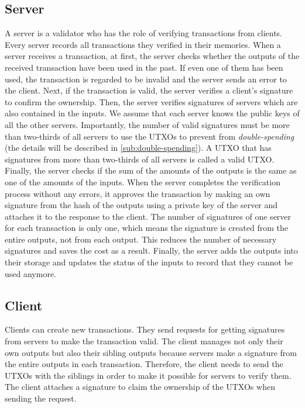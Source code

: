 \documentclass[a4paper, oneside]{discothesis}
\begin{document}
\subsection{Server}
A server is a validator who has the role of verifying transactions from clients.
Every server records all transactions they verified in their memories.
When a server receives a transaction, at first, the server checks
whether the outputs of the received transaction have been used in the past.
If even one of them has been used, the transaction is regarded to be invalid
and the server sends an error to the client.
Next, if the transaction is valid, the server verifies a client's signature
to confirm the ownership.
Then, the server verifies signatures of servers which are also contained in the inputs.
We assume that each server knows the public keys of all the other servers.
Importantly, the number of valid signatures must be more than two-thirds of all servers
to use the UTXOs to prevent from \emph{double-spending}
(the details will be described in \ref{sub:double-spending}).
A UTXO that has signatures from more than two-thirds of all servers is called a valid UTXO.
Finally, the server checks if the sum of the amounts of the outputs is the same
as one of the amounts of the inputs.
When the server completes the verification process without any errors,
it approves the transaction by making an own signature from the hash of the outputs
using a private key of the server and attaches it to the response to the client.
The number of signatures of one server for each transaction is only one,
which means the signature is created from the entire outputs, not from each output.
This reduces the number of necessary signatures and saves the cost as a result.
Finally, the server adds the outputs into their storage
and updates the status of the inputs to record that they cannot be used anymore.


\subsection{Client}
Clients can create new transactions.
They send requests for getting signatures from servers to make the transaction valid.
The client manages not only their own outputs but also their sibling outputs
because servers make a signature from the entire outputs in each transaction.
Therefore, the client needs to send the UTXOs with the siblings
in order to make it possible for servers to verify them.
The client attaches a signature to claim the ownership of the UTXOs when sending the request.
\end{document}
